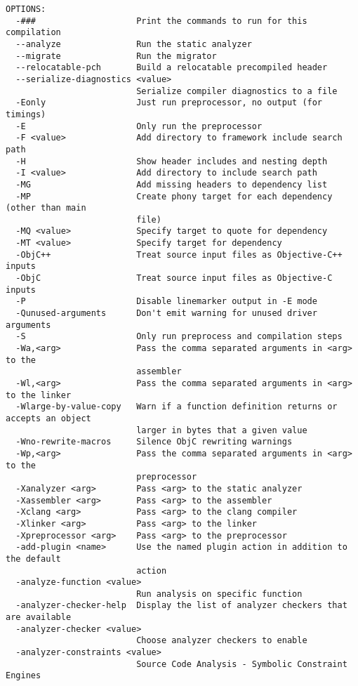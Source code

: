 \begin{verbatim}
OPTIONS:
  -###                    Print the commands to run for this compilation
  --analyze               Run the static analyzer
  --migrate               Run the migrator
  --relocatable-pch       Build a relocatable precompiled header
  --serialize-diagnostics <value>
                          Serialize compiler diagnostics to a file
  -Eonly                  Just run preprocessor, no output (for timings)
  -E                      Only run the preprocessor
  -F <value>              Add directory to framework include search path
  -H                      Show header includes and nesting depth
  -I <value>              Add directory to include search path
  -MG                     Add missing headers to dependency list
  -MP                     Create phony target for each dependency (other than main 
                          file)
  -MQ <value>             Specify target to quote for dependency
  -MT <value>             Specify target for dependency
  -ObjC++                 Treat source input files as Objective-C++ inputs
  -ObjC                   Treat source input files as Objective-C inputs
  -P                      Disable linemarker output in -E mode
  -Qunused-arguments      Don't emit warning for unused driver arguments
  -S                      Only run preprocess and compilation steps
  -Wa,<arg>               Pass the comma separated arguments in <arg> to the 
                          assembler
  -Wl,<arg>               Pass the comma separated arguments in <arg> to the linker
  -Wlarge-by-value-copy   Warn if a function definition returns or accepts an object 
                          larger in bytes that a given value
  -Wno-rewrite-macros     Silence ObjC rewriting warnings
  -Wp,<arg>               Pass the comma separated arguments in <arg> to the 
                          preprocessor
  -Xanalyzer <arg>        Pass <arg> to the static analyzer
  -Xassembler <arg>       Pass <arg> to the assembler
  -Xclang <arg>           Pass <arg> to the clang compiler
  -Xlinker <arg>          Pass <arg> to the linker
  -Xpreprocessor <arg>    Pass <arg> to the preprocessor
  -add-plugin <name>      Use the named plugin action in addition to the default 
                          action
  -analyze-function <value>
                          Run analysis on specific function
  -analyzer-checker-help  Display the list of analyzer checkers that are available
  -analyzer-checker <value>
                          Choose analyzer checkers to enable
  -analyzer-constraints <value>
                          Source Code Analysis - Symbolic Constraint Engines

\end{verbatim}
